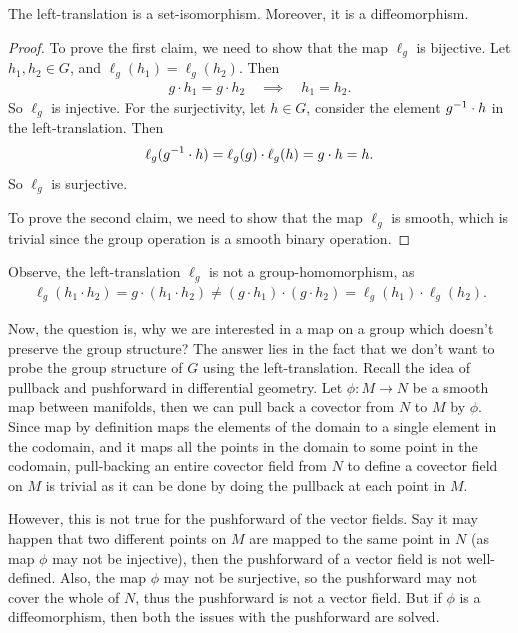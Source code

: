 \begin{proposition}
    The left-translation is a set-isomorphism. Moreover, it is a diffeomorphism.
\end{proposition}
\begin{proof}
    To prove the first claim, we need to show that the map \(\ell_g\) is bijective. Let \(h_1, h_2 \in G\), and \(\ell_g(h_1) = \ell_g(h_2)\). Then
    \begin{align*}
        g \cdot h_1 = g \cdot h_2 \quad \implies \quad h_1 = h_2.
    \end{align*}
    So \(\ell_g\) is injective. For the surjectivity, let \(h \in G\), consider the element \(g^{-1} \cdot h\) in the left-translation. Then
    \begin{align*}
        \ell_g(g^{-1} \cdot h) = \ell_g(g) \cdot \ell_g(h) = g \cdot h = h.
    \end{align*}
    So \(\ell_g\) is surjective.

    To prove the second claim, we need to show that the map \(\ell_g\) is smooth, which is trivial since the group operation is a smooth binary operation.
\end{proof}
Observe, the left-translation \(\ell_g\) is not a group-homomorphism, as
\begin{align*}
    \ell_g(h_1 \cdot h_2) = g \cdot (h_1 \cdot h_2) \neq (g \cdot h_1) \cdot (g \cdot h_2) = \ell_g(h_1) \cdot \ell_g(h_2).
\end{align*}

Now, the question is, why we are interested in a map on a group which doesn't preserve the group structure? The answer lies in the fact that we don't want to probe the group structure of \(G\) using the left-translation. Recall the idea of pullback and pushforward in differential geometry. Let \(\phi: M \to N\) be a smooth map between manifolds, then we can pull back a covector from \(N\) to \(M\) by \(\phi\). Since map by definition maps the elements of the domain to a single element in the codomain, and it maps all the points in the domain to some point in the codomain, pull-backing an entire covector field from \(N\) to define a covector field on \(M\) is trivial as it can be done by doing the pullback at each point in \(M\).

However, this is not true for the pushforward of the vector fields. Say it may happen that two different points on \(M\) are mapped to the same point in \(N\) (as map \(\phi\) may not be injective), then the pushforward of a vector field is not well-defined. Also, the map \(\phi\) may not be surjective, so the pushforward may not cover the whole of \(N\), thus the pushforward is not a vector field. But if \(\phi\) is a diffeomorphism, then both the issues with the pushforward are solved.

